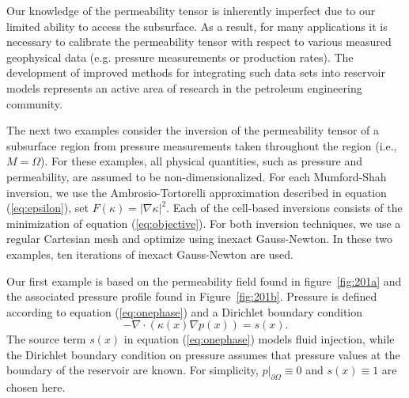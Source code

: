\documentclass[manuscript,revised]{geophysics}
\begin{document}
Our knowledge of the permeability tensor is inherently imperfect due to our limited ability to access the subsurface.  As a result, for many applications it is necessary to calibrate the permeability tensor with respect to various measured geophysical data (e.g. pressure measurements or production rates).  The development of improved methods for integrating such data sets into reservoir models represents an active area of research in the petroleum engineering community.  

The next two examples consider the inversion of the permeability tensor of a subsurface region from pressure measurements taken throughout the region (i.e., $M=\Omega$). For these examples, all physical quantities, such as pressure and permeability, are assumed to be non-dimensionalized.  For each Mumford-Shah inversion, we use the Ambrosio-Tortorelli approximation described in equation (\ref{eq:epsilon}), set $F(\kappa)=\left\vert \nabla \kappa \right\vert^2$.  Each of the cell-based inversions consists of the minimization of equation (\ref{eq:objective}).  For both inversion techniques, we use a regular Cartesian mesh and optimize using inexact Gauss-Newton.  In these two examples, ten iterations of inexact Gauss-Newton are used.  

Our first example is based on the permeability field found in figure~\ref{fig:201a} and the associated pressure profile found in Figure~\ref{fig:201b}.  Pressure is defined according to equation (\ref{eq:onephase}) and a Dirichlet boundary condition
\begin{equation} \label{eq:onephase}
-\nabla \cdot \left( \kappa (x)\nabla p(x) \right)=s(x).
\end{equation}
The source term $s(x)$ in equation (\ref{eq:onephase}) models fluid injection, while the Dirichlet boundary condition on pressure assumes that pressure values at the boundary of the reservoir are known.  For simplicity, $p\vert_{\partial\Omega} \equiv 0$ and $s(x) \equiv 1$ are chosen here. 
\end{document}
